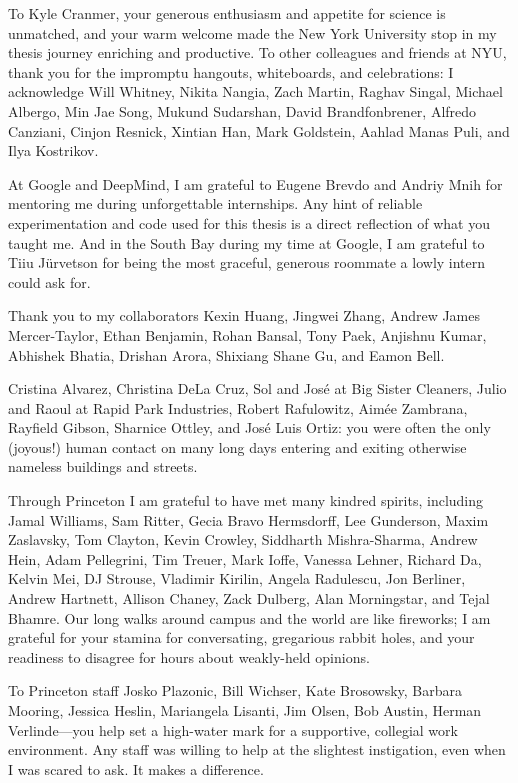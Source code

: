 {To Kyle Cranmer, your generous enthusiasm and appetite for science is unmatched, and your warm welcome made the New York University stop in my thesis journey enriching and productive. To other colleagues and friends at NYU, thank you for the impromptu hangouts, whiteboards, and celebrations: I acknowledge Will Whitney, Nikita Nangia, Zach Martin, Raghav Singal, Michael Albergo, Min Jae Song, Mukund Sudarshan, David Brandfonbrener, Alfredo Canziani, Cinjon Resnick, Xintian Han, Mark Goldstein, Aahlad Manas Puli, and Ilya Kostrikov.

At Google and DeepMind, I am grateful to Eugene Brevdo and Andriy Mnih for mentoring me during unforgettable internships. Any hint of reliable experimentation and code used for this thesis is a direct reflection of what you taught me. And in the South Bay during my time at Google, I am grateful to Tiiu Jürvetson for being the most graceful, generous roommate a lowly intern could ask for.

Thank you to my collaborators Kexin Huang, Jingwei Zhang, Andrew James Mercer-Taylor, Ethan Benjamin, Rohan Bansal, Tony Paek, Anjishnu Kumar, Abhishek Bhatia, Drishan Arora, Shixiang Shane Gu, and Eamon Bell.

Cristina Alvarez, Christina DeLa Cruz, Sol and José at Big Sister Cleaners, Julio and Raoul at Rapid Park Industries, Robert Rafulowitz, Aimée Zambrana, Rayfield Gibson, Sharnice Ottley, and José Luis Ortiz: you were often the only (joyous!) human contact on many long days entering and exiting otherwise nameless buildings and streets.

Through Princeton I am grateful to have met many kindred spirits, including Jamal Williams, Sam Ritter, Gecia Bravo Hermsdorff, Lee Gunderson, Maxim Zaslavsky, Tom Clayton, Kevin Crowley, Siddharth Mishra-Sharma, Andrew Hein, Adam Pellegrini, Tim Treuer, Mark Ioffe, Vanessa Lehner, Richard Da, Kelvin Mei, DJ Strouse, Vladimir Kirilin, Angela Radulescu, Jon Berliner, Andrew Hartnett, Allison Chaney, Zack Dulberg, Alan Morningstar, and Tejal Bhamre. Our long walks around campus and the world are like fireworks; I am grateful for your stamina for conversating, gregarious rabbit holes, and your readiness to disagree for hours about weakly-held opinions.

To Princeton staff Josko Plazonic, Bill Wichser, Kate Brosowsky, Barbara Mooring, Jessica Heslin, Mariangela Lisanti, Jim Olsen, Bob Austin, Herman Verlinde---you help set a high-water mark for a supportive, collegial work environment. Any staff was willing to help at the slightest instigation, even when I was scared to ask. It makes a difference.

}
